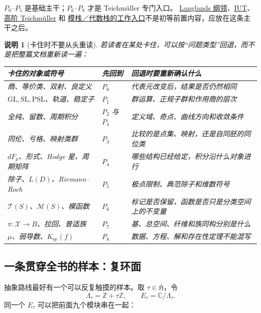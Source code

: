 \documentclass[UTF8,fontset=none,a4paper,11pt]{ctexart}
\theoremstyle{foundation-definition}
\theoremstyle{foundation-theorem}
\theoremstyle{foundation-proposition}
\theoremstyle{foundation-example}
\theoremstyle{foundation-remark}
\newtheorem{remark}[definition]{说明}
\theoremstyle{foundation-theorem}
\newcommand{\T}{\mathcal T}
\newcommand{\M}{\mathcal M}
\newcommand{\term}[2]{\hyperref[#1]{#2}}
\begin{document}
\(P_0\)--\(P_5\) 是基础主干；\(P_6\)--\(P_8\) 才是 Teichmüller 专门入口。
\term{def:langlands-program}{Langlands 纲领}、\term{def:iut-program}{IUT}、
\term{def:higher-teichmuller}{高阶 Teichmüller} 和
\term{def:moduli-stack}{模栈／代数栈的工作入口}不是初等前置内容，应放在这条主干之后。

\begin{remark}[卡住时不要从头重读]
若读者在某处卡住，可以按“问题类型”回退，而不是把整篇文档重新读一遍：
\begin{center}
{\small
\begin{tabularx}{\textwidth}{p{}p{}X}
\toprule
卡住的对象或符号 & 先回到 & 回退时要重新确认什么 \\
\midrule
商、等价类、双射、良定义 & \(P_0\) & 代表元改变后，结果是否仍然相同 \\
\(\mathrm{GL},\mathrm{SL},\mathrm{PSL}\)、轨道、稳定子 & \(P_1\) & 群运算、正规子群和作用商的层次 \\
全纯、留数、周期积分 & \(P_2\) 与 \(P_4\) & 定义域、奇点、曲线方向和收敛条件 \\
同伦、亏格、映射类群 & \(P_3\) & 比较的是点集、映射，还是自同胚的同位类 \\
\(dF_p\)、形式、Hodge 星、周期矩阵 & \(P_4\) & 哪些结构已经给定，积分沿什么对象进行 \\
除子、\(L(D)\)、Riemann--Roch & \(P_5\) & 极点限制、典范除子和维数符号 \\
\(\T(S)\)、\(\M(S)\)、模函数 & \(P_6\) & 标记是否保留，函数是否只是分类空间上的不变量 \\
\(\pi:\mathcal X\to B\)、拉回、普适族 & \(P_7\) & 基、总空间、纤维和族同构分别是什么 \\
\(\mu\)、弱导数、\(K_{\mathrm{qc}}(f)\) & \(P_8\) & 数据、方程、解和存在性定理不能混写 \\
\bottomrule
\end{tabularx}}
\end{center}
\end{remark}

\subsection{一条贯穿全书的样本：复环面}

抽象路线最好有一个可以反复触摸的样本。取 \(\tau\in\mathfrak H\)，令
\[
\Lambda_\tau=\mathbb Z+\tau\mathbb Z,
\qquad
E_\tau=\mathbb C/\Lambda_\tau.
\]
同一个 \(E_\tau\) 可以把前面九个模块串在一起：
\end{document}
